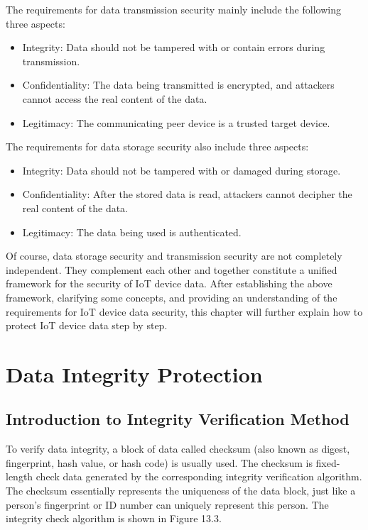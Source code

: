 \documentclass[a4paper,12pt]{book}
\begin{document}
The requirements for data transmission security mainly include the following three aspects:

\begin{itemize}[noitemsep]
    \item Integrity: Data should not be tampered with or contain errors during transmission.
    \item Confidentiality: The data being transmitted is encrypted, and attackers cannot access the real content of the data.
    \item Legitimacy: The communicating peer device is a trusted target device.
\end{itemize}

The requirements for data storage security also include three aspects:

\begin{itemize}[noitemsep]
    \item Integrity: Data should not be tampered with or damaged during storage.
    \item Confidentiality: After the stored data is read, attackers cannot decipher the real content of the data.
    \item Legitimacy: The data being used is authenticated.
\end{itemize}

Of course, data storage security and transmission security are not completely independent. They complement each other and together constitute a unified framework for the security of IoT device data. After establishing the above framework, clarifying some concepts, and providing an understanding of the requirements for IoT device data security, this chapter will further explain how to protect IoT device data step by step.

\section{Data Integrity Protection}
\subsection{Introduction to Integrity Verification Method}
To verify data integrity, a block of data called checksum (also known as digest, fingerprint, hash value, or hash code) is usually used. The checksum is fixed-length check data generated by the corresponding integrity verification algorithm. The checksum essentially represents the uniqueness of the data block, just like a person’s fingerprint or ID number can uniquely represent this person. The integrity check algorithm is shown in Figure 13.3.
\end{document}
